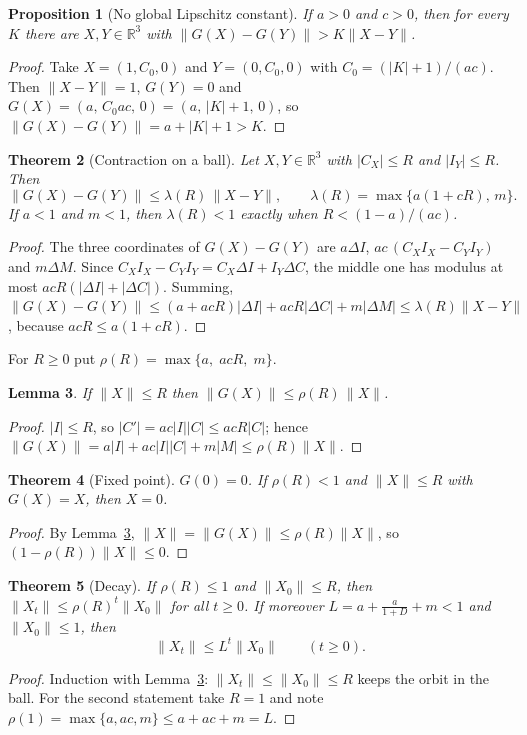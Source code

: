 \documentclass[11pt]{article}
\newtheorem{theorem}{Theorem}[section]
\newtheorem{proposition}[theorem]{Proposition}
\newtheorem{lemma}[theorem]{Lemma}
\theoremstyle{definition}
\theoremstyle{remark}
\newcommand{\R}{\mathbb{R}}
\newcommand{\nrm}[1]{\lVert #1\rVert}
\begin{document}
\begin{proposition}[No global Lipschitz constant]\label{prop:nolip}
If $a>0$ and $c>0$, then for every $K$ there are $X,Y\in\R^3$ with $\nrm{G(X)-G(Y)}>K\nrm{X-Y}$.
\end{proposition}
\begin{proof}
Take $X=(1,C_0,0)$ and $Y=(0,C_0,0)$ with $C_0=(|K|+1)/(ac)$. Then $\nrm{X-Y}=1$, $G(Y)=0$ and
$G(X)=(a,\,C_0ac,\,0)=(a,\,|K|+1,\,0)$, so $\nrm{G(X)-G(Y)}=a+|K|+1>K$.
\end{proof}

\begin{theorem}[Contraction on a ball]\label{thm:ball}
Let $X,Y\in\R^3$ with $|C_X|\le R$ and $|I_Y|\le R$. Then
\[
\nrm{G(X)-G(Y)}\le\lambda(R)\,\nrm{X-Y},\qquad \lambda(R)=\max\{a(1+cR),\,m\}.
\]
If $a<1$ and $m<1$, then $\lambda(R)<1$ exactly when $R<(1-a)/(ac)$.
\end{theorem}
\begin{proof}
The three coordinates of $G(X)-G(Y)$ are $a\Delta I$, $ac\,(C_XI_X-C_YI_Y)$ and $m\Delta M$. Since
$C_XI_X-C_YI_Y=C_X\Delta I+I_Y\Delta C$, the middle one has modulus at most $acR(|\Delta I|+|\Delta C|)$. Summing,
$\nrm{G(X)-G(Y)}\le(a+acR)|\Delta I|+acR|\Delta C|+m|\Delta M|\le\lambda(R)\nrm{X-Y}$, because $acR\le a(1+cR)$.
\end{proof}

For $R\ge0$ put $\rho(R)=\max\{a,\;acR,\;m\}$.

\begin{lemma}\label{lem:size}
If $\nrm X\le R$ then $\nrm{G(X)}\le\rho(R)\,\nrm X$.
\end{lemma}
\begin{proof}
$|I|\le R$, so $|C'|=ac|I||C|\le acR|C|$; hence $\nrm{G(X)}=a|I|+ac|I||C|+m|M|\le\rho(R)\nrm X$.
\end{proof}

\begin{theorem}[Fixed point]\label{thm:fixed}
$G(0)=0$. If $\rho(R)<1$ and $\nrm X\le R$ with $G(X)=X$, then $X=0$.
\end{theorem}
\begin{proof}
By Lemma~\ref{lem:size}, $\nrm X=\nrm{G(X)}\le\rho(R)\nrm X$, so $(1-\rho(R))\nrm X\le0$.
\end{proof}

\begin{theorem}[Decay]\label{thm:decay}
If $\rho(R)\le1$ and $\nrm{X_0}\le R$, then $\nrm{X_t}\le\rho(R)^t\nrm{X_0}$ for all $t\ge0$. If moreover
$L=a+\frac{a}{1+D}+m<1$ and $\nrm{X_0}\le1$, then
\[
\nrm{X_t}\le L^t\nrm{X_0}\qquad(t\ge0).
\]
\end{theorem}
\begin{proof}
Induction with Lemma~\ref{lem:size}: $\nrm{X_t}\le\nrm{X_0}\le R$ keeps the orbit in the ball. For the second
statement take $R=1$ and note $\rho(1)=\max\{a,ac,m\}\le a+ac+m=L$.
\end{proof}
\end{document}

